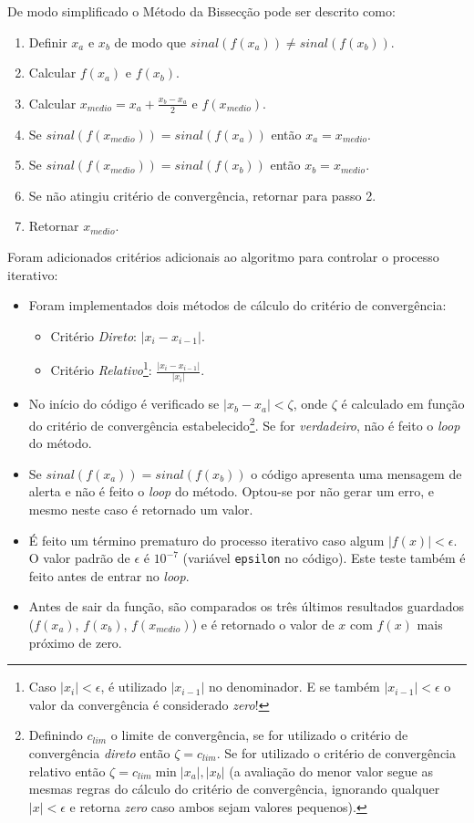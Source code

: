 \documentclass[final,3p,12pt]{elsarticle}
\begin{document}
    De modo simplificado o Método da Bissecção pode ser descrito como:
    
    \begin{enumerate}
        \item Definir $x_a$ e $x_b$ de modo que $sinal(f(x_a)) \neq sinal(f(x_b))$.
        \item Calcular $f(x_a)$ e $f(x_b)$.
        \item Calcular $x_{medio} = x_a + \frac{x_b - x_a}{2}$ e $f(x_{medio})$.
        \item Se $sinal(f(x_{medio})) = sinal(f(x_a))$ então $x_a = x_{medio}$.
        \item Se $sinal(f(x_{medio})) = sinal(f(x_b))$ então $x_b = x_{medio}$.
        \item Se não atingiu critério de convergência, retornar para passo 2.
        \item Retornar $x_{medio}$.
    \end{enumerate}
    
    Foram adicionados critérios adicionais ao algoritmo para controlar o processo iterativo:

    \begin{itemize}
        \item Foram implementados dois métodos de cálculo do critério de convergência:
        \begin{itemize}
            \item Critério \emph{Direto}: $|x_i - x_{i-1}|$.
            \item Critério \emph{Relativo}\footnote{Caso $|x_i| < \epsilon$, é utilizado $|x_{i-1}|$ no denominador. E se também $|x_{i-1}| < \epsilon$ o valor da convergência é considerado \emph{zero}!}: $\frac{|x_i - x_{i-1}|}{|x_i|}$.
        \end{itemize}
        \item No início do código é verificado se $|x_b - x_a| < \zeta$, onde $\zeta$ é calculado em função do critério de convergência estabelecido\footnote{Definindo $c_{lim}$ o limite de convergência, se for utilizado o critério de convergência \emph{direto} então $\zeta = c_{lim}$. Se for utilizado o critério de convergência relativo então $\zeta = c_{lim} \min{|x_a|,|x_b|}$ (a avaliação do menor valor segue as mesmas regras do cálculo do critério de convergência, ignorando qualquer $|x| < \epsilon$ e retorna \emph{zero} caso ambos sejam valores pequenos).}. Se for \emph{verdadeiro}, não é feito o \emph{loop} do método. 
        \item Se $sinal(f(x_a)) = sinal(f(x_b))$ o código apresenta uma mensagem de alerta e não é feito o \emph{loop} do método. Optou-se por não gerar um erro, e mesmo neste caso é retornado um valor.
        \item É feito um término prematuro do processo iterativo caso algum $|f(x)| < \epsilon$. O valor padrão de $\epsilon$ é $10^{-7}$ (variável \verb|epsilon| no código). Este teste também é feito antes de entrar no \emph{loop}.
        \item Antes de sair da função, são comparados os três últimos resultados guardados ($f(x_a)$, $f(x_b)$, $f(x_{medio})$) e é retornado o valor de $x$ com $f(x)$ mais próximo de zero.
    \end{itemize}
    
\end{document}
